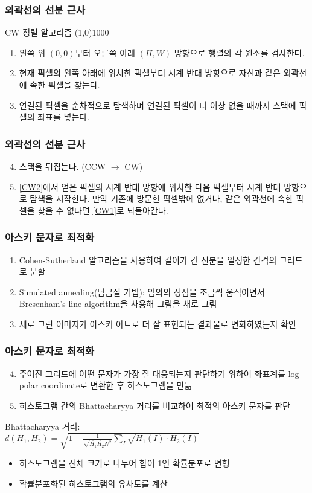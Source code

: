 \documentclass{beamer}
\begin{document}
	\begin{frame}{}
		\frametitle{외곽선의 선분 근사}
		CW 정렬 알고리즘
		\line(1,0){1000}
		\begin{enumerate}
			\item 왼쪽 위 $(0, 0)$부터 오른쪽 아래 $(H, W)$ 방향으로 행렬의 각 원소를 검사한다. \label{CW1}
			\item 현재 픽셀의 왼쪽 아래에 위치한 픽셀부터 시계 반대 방향으로 자신과 같은 외곽선에 속한 픽셀을 찾는다. \label{CW2}
			\item 연결된 픽셀을 순차적으로 탐색하며 연결된 픽셀이 더 이상 없을 때까지 스택에 픽셀의 좌표를 넣는다.
		\end{enumerate}
	\end{frame}
	\begin{frame}{}
		\frametitle{외곽선의 선분 근사}
		\begin{enumerate}
			\setcounter{enumi}{3}
			\item 스택을 뒤집는다. (CCW $ \rightarrow $ CW)
			\item \ref{CW2}에서 얻은 픽셀의 시계 반대 방향에 위치한 다음 픽셀부터 시계 반대 방향으로 탐색을 시작한다.
			만약 기존에 방문한 픽셀밖에 없거나, 같은 외곽선에 속한 픽셀을 찾을 수 없다면 \ref{CW1}로 되돌아간다.
		\end{enumerate}
	\end{frame}
	\begin{frame}{}
		\frametitle{아스키 문자로 최적화}
		\begin{enumerate}
			\item Cohen-Sutherland 알고리즘을 사용하여 길이가 긴 선분을 일정한 간격의 그리드로 분할
			\item Simulated annealing(담금질 기법): 임의의 정점을 조금씩 움직이면서 Bresenham's line algorithm을 사용해 그림을 새로 그림
			\item 새로 그린 이미지가 아스키 아트로 더 잘 표현되는 결과물로 변화하였는지 확인
		\end{enumerate}	
	\end{frame}
	\begin{frame}{}
		\frametitle{아스키 문자로 최적화}
		\begin{enumerate}
			\setcounter{enumi}{3}
			\item 주어진 그리드에 어떤 문자가 가장 잘 대응되는지 판단하기 위하여 좌표계를 log-polar coordinate로 변환한 후 히스토그램을 만듦
			\item 히스토그램 간의 Bhattacharyya 거리를 비교하여 최적의 아스키 문자를 판단
		\end{enumerate}
		\vspace{1em}
		Bhattacharyya 거리: \\
		\vspace{0.5em}
		\centering
		$ \displaystyle d(H_1,H_2) = \sqrt{1 - \frac{1}{\sqrt{\bar{H_1} \bar{H_2} N^2}} \sum_I \sqrt{H_1(I) \cdot H_2(I)}} $
		\vspace{0.5em}
		\begin{itemize}
			\item 히스토그램을 전체 크기로 나누어 합이 1인 확률분포로 변형
			\item 확률분포화된 히스토그램의 유사도를 계산
		\end{itemize}
	\end{frame}
\end{document}
